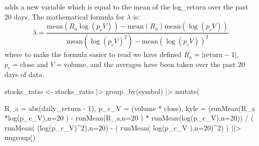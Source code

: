 \documentclass[
  letterpaper,
  DIV=11,
  numbers=noendperiod]{scrartcl}
\newenvironment{Shaded}{\begin{snugshade}}{\end{snugshade}}
\newcommand{\AttributeTok}[1]{\textcolor[rgb]{0.40,0.45,0.13}{#1}}
\newcommand{\DecValTok}[1]{\textcolor[rgb]{0.68,0.00,0.00}{#1}}
\newcommand{\FunctionTok}[1]{\textcolor[rgb]{0.28,0.35,0.67}{#1}}
\newcommand{\NormalTok}[1]{\textcolor[rgb]{0.00,0.23,0.31}{#1}}
\newcommand{\OtherTok}[1]{\textcolor[rgb]{0.00,0.23,0.31}{#1}}
\newcommand{\SpecialCharTok}[1]{\textcolor[rgb]{0.37,0.37,0.37}{#1}}
\begin{document}
adds a new variable which is equal to the mean of the log\_return over
the past 20 days. The mathematical formula for \(\lambda\) is: \[
\lambda = \frac{\mathrm{mean}(R_a\log( p_c V ))
- \mathrm{mean}\left(R_a\right) \mathrm{mean}\left(\log\left(p_c V\right) \right) }
{\mathrm{mean}\left(\log\left( p_c V \right)^2\right)
-\mathrm{mean}\left(\log(p_c V)\right)^2 }
\] where to make the formula easier to read we have defined
\(R_a = |\mathrm{return} -1|\), \(p_c = \mathrm{close}\) and
\(V = \mathrm{volume}\), and the averages have been taken over the past
20 days of data.

\begin{Shaded}
\begin{Highlighting}[]
\NormalTok{stocks\_ratio }\OtherTok{\textless{}{-}}\NormalTok{ stocks\_ratio }\SpecialCharTok{|\textgreater{}}
  \FunctionTok{group\_by}\NormalTok{(symbol) }\SpecialCharTok{|\textgreater{}}
  \FunctionTok{mutate}\NormalTok{(}
    
    \AttributeTok{R\_a =} \FunctionTok{abs}\NormalTok{(daily\_return }\SpecialCharTok{{-}} \DecValTok{1}\NormalTok{),  }
    \AttributeTok{p\_c\_V =}\NormalTok{ (volume }\SpecialCharTok{*}\NormalTok{ close),  }
    \AttributeTok{kyle =}\NormalTok{ (}\FunctionTok{runMean}\NormalTok{(R\_a }\SpecialCharTok{*}\FunctionTok{log}\NormalTok{(p\_c\_V),}\AttributeTok{n=}\DecValTok{20}\NormalTok{ ) }\SpecialCharTok{{-}}
                \FunctionTok{runMean}\NormalTok{(R\_a,}\AttributeTok{n=}\DecValTok{20}\NormalTok{ ) }\SpecialCharTok{*} \FunctionTok{runMean}\NormalTok{(}\FunctionTok{log}\NormalTok{(p\_c\_V),}\AttributeTok{n=}\DecValTok{20}\NormalTok{)) }
              \SpecialCharTok{/} 
\NormalTok{             (}
               \FunctionTok{runMean}\NormalTok{(}
\NormalTok{                 (}\FunctionTok{log}\NormalTok{(p\_c\_V)}\SpecialCharTok{\^{}}\DecValTok{2}\NormalTok{),}\AttributeTok{n=}\DecValTok{20}\NormalTok{) }\SpecialCharTok{{-}}
\NormalTok{                 (}
                   \FunctionTok{runMean}\NormalTok{(}
                     \FunctionTok{log}\NormalTok{(p\_c\_V ),}\AttributeTok{n=}\DecValTok{20}\NormalTok{)}\SpecialCharTok{\^{}}\DecValTok{2}\NormalTok{)  }
\NormalTok{  )}
\NormalTok{  )}\SpecialCharTok{|\textgreater{}}
  \FunctionTok{ungroup}\NormalTok{()}
\end{Highlighting}
\end{Shaded}
\end{document}
